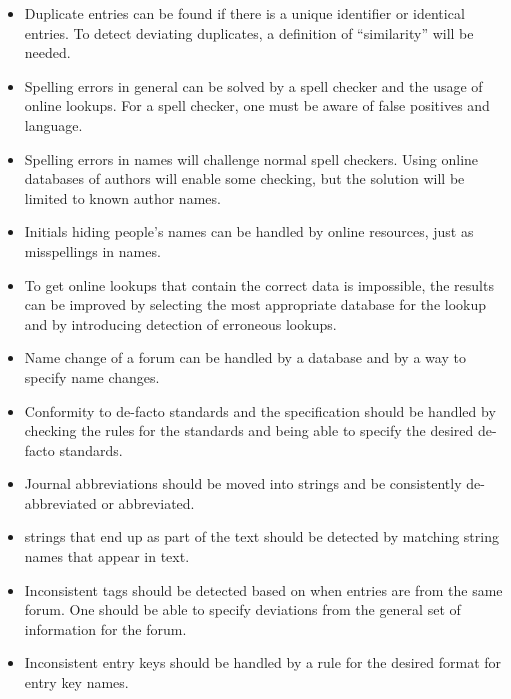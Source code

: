 \begin{itemize}
\item Duplicate entries can be found if there is a unique identifier
  or identical entries.  To detect deviating duplicates, a definition
  of ``similarity'' will be needed.

\item Spelling errors in general can be solved by a spell checker and
  the usage of online lookups.  For a spell checker, one must be aware
  of false positives and language.

\item Spelling errors in names will challenge normal spell checkers.
  Using online databases of authors will enable some checking, but the
  solution will be limited to known author names.

\item Initials hiding people's names can be handled by online
  resources, just as misspellings in names.

\item To get online lookups that contain the correct data is
  impossible, the results can be improved by selecting the most
  appropriate database for the lookup and by introducing detection of
  erroneous lookups.

\item Name change of a forum can be handled by a database and by a way
  to specify name changes.

\item Conformity to de-facto standards and the {\bibtex} specification
  should be handled by checking the rules for the standards and being
  able to specify the desired de-facto standards.

\item Journal abbreviations should be moved into strings and be
  consistently de-abbreviated or abbreviated.

\item {\bibtex} strings that end up as part of the text should be
  detected by matching string names that appear in text.

\item Inconsistent tags should be detected based on when entries are
  from the same forum.  One should be able to specify deviations from
  the general set of information for the forum.

\item Inconsistent entry keys should be handled by a rule for the
  desired format for entry key names.
\end{itemize}

